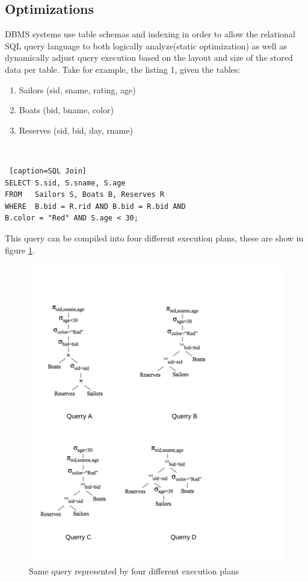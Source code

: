 \documentclass[10pt,twocolumn]{IEEEtran11}
\begin{document}
\subsection{Optimizations}
DBMS systems use table schemas and indexing in order to allow the relational SQL query language to both logically analyze(static optimization) as well as dynamically adjust query execution based on the layout and size of the stored data per table. Take for example, the listing 1, given the tables:
\  \\
\begin{enumerate}
	\setlength\itemsep{1em}
	\item Sailors (sid, sname, rating, age)
	\item Boats (bid, bname, color)
	\item Reserves (sid, bid, day, rname)
\end{enumerate}
\  \\
\begin{lstlisting} [caption=SQL Join]
SELECT S.sid, S.sname, S.age
FROM   Sailors S, Boats B, Reserves R
WHERE  B.bid = R.rid AND B.bid = R.bid AND
B.color = "Red" AND S.age < 30;
\end{lstlisting}

This query can be compiled into four different execution plans, these are show in figure \ref{fig:queryExecutionPlan}.

\begin{figure}[h]
	\centering
	\includegraphics[scale=0.90]{images/logicalExecution.png}
	\caption{Same query represented by four different execution plans \protect\cite{LectureDB}}
	\label{fig:queryExecutionPlan}
\end{figure}
\end{document}
